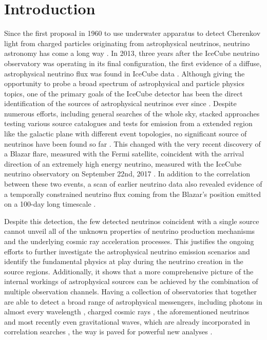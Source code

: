 \chapter{Introduction}

Since the first proposal in  1960 to use underwater apparatus to detect Cherenkov light from charged particles originating from astrophysical neutrinos, neutrino astronomy has come a long way \cite{Markov:1960vja}.
In 2013, three years after the IceCube neutrino observatory was operating in its final configuration, the first evidence of a diffuse, astrophysical neutrino flux was found in IceCube data \cite{Aartsen:2013jdh,Aartsen:2016nxy}.
Although giving the opportunity to probe a broad spectrum of astrophysical and particle physics topics, one of the primary goals of the IceCube detector has been the direct identification of the sources of astrophysical neutrinos ever since \cite{Katz:2011ke,GOLDSCHMIDT:2002ICScienceGoals}.
Despite numerous efforts, including general searches of the whole sky, stacked approaches testing various source catalogues and tests for emission from a extended region like the galactic plane with different event topologies, no significant source of neutrinos have been found so far \cite{Ahlers:2014ioa,Aartsen:2016oji,Aartsen:2013jdh,Aartsen:2016qcr,Adrian-Martinez:2015ver,Aartsen:2016tpb,IceCube:2018cha,Aartsen:2015dml,Abbasi:2009kq,Aartsen:2014PS4yrs,Aartsen:2015wto}.
This changed with the very recent discovery of a Blazar flare, measured with the Fermi satellite, coincident with the arrival direction of an extremely high energy neutrino, measured with the IceCube neutrino observatory on September 22nd, 2017 \cite{Keivani:2018rnh}.
In addition to the correlation between these two events, a scan of earlier neutrino data also revealed evidence of a temporally constrained neutrino flux coming from the Blazar's position emitted on a 100-day long timescale \cite{IceCube:2018cha}.

Despite this detection, the few detected neutrinos coincident with a single source cannot unveil all of the unknown properties of neutrino production mechanisms and the underlying cosmic ray acceleration processes.
This justifies the ongoing efforts to further investigate the astrophysical neutrino emission scenarios and identify the fundamental physics at play during the neutrino creation in the source regions.
Additionally, it shows that a more comprehensive picture of the internal workings of astrophysical sources can be achieved by the combination of multiple observation channels.
Having a collection of observatories that together are able to detect a broad range of astrophysical messengers, including photons in almost every wavelength \cite{Huber:2016Photons}, charged cosmic rays \cite{BLANDFORD:2014CRs,Sommers:2009CRs}, the aforementioned neutrinos and most recently even gravitational waves, which are already incorporated in correlation searches \cite{Abbott:2016blz,Adrian-Martinez:2016xgn}, the way is paved for powerful new analyses \cite{Branchesi:2016MultiMessenger}.

